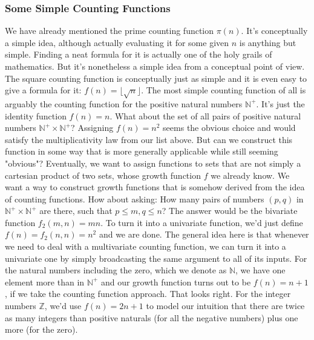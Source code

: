 \documentclass[12pt]{article}
\begin{document}
\subsubsection{Some Simple Counting Functions}
We have already mentioned the prime counting function $\pi(n)$. It's conceptually a simple idea, although actually evaluating it for some given $n$ is anything but simple. Finding a neat formula for it is actually one of the holy grails of mathematics. But it's nonetheless a simple idea from a conceptual point of view. The square counting function is conceptually just as simple and it is even easy to give a formula for it: $f(n) = \lfloor \sqrt{n} \rfloor$. The most simple counting function of all is arguably the counting function for the positive natural numbers $\mathbb{N}^+$. It's just the identity function $f(n) = n$. What about the set of all pairs of positive natural numbers $\mathbb{N}^+ \times \mathbb{N}^+$? Assigning $f(n) = n^2$ seems the obvious choice and would satisfy the multiplicativity law from our list above. But can we construct this function in some way that is more generally applicable while still seeming "obvious"? Eventually, we want to assign functions to sets that are not simply a cartesian product of two sets, whose growth function $f$ we already know. We want a way to construct growth functions that is somehow derived from the idea of counting functions. How about asking: How many pairs of numbers $(p,q)$ in  $\mathbb{N}^+ \times \mathbb{N}^+$ are there, such that $p \leq m, q \leq n$? The answer would be the bivariate function $f_2(m,n) = m n$. To turn it into a univariate function, we'd just define $f(n) = f_2(n,n) = n^2$ and we are done. The general idea here is that whenever we need to deal with a multivariate counting function, we can turn it into a univariate one by simply broadcasting the same argument to all of its inputs. For the natural numbers including the zero, which we denote as $\mathbb{N}$, we have one element more than in $\mathbb{N}^+$ and our growth function turns out to be $f(n) = n+1$, if we take the counting function approach. That looks right. For the integer numbers $\mathbb{Z}$, we'd use $f(n) = 2 n + 1$ to model our intuition that there are twice as many integers than positive naturals (for all the negative numbers) plus one more (for the zero).

\end{document}
